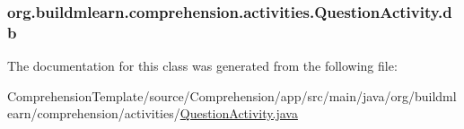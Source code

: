 \subsubsection[{\texorpdfstring{db}{db}}]{ org.\+buildmlearn.\+comprehension.\+activities.\+Question\+Activity.\+db\hspace{0.3cm}{\ttfamily [private]}}\hypertarget{classorg_1_1buildmlearn_1_1comprehension_1_1activities_1_1QuestionActivity_a95d8ebe7963a070ca906f55a01e02574}{}\label{classorg_1_1buildmlearn_1_1comprehension_1_1activities_1_1QuestionActivity_a95d8ebe7963a070ca906f55a01e02574}


The documentation for this class was generated from the following file\+:\begin{DoxyCompactItemize}
\item 
Comprehension\+Template/source/\+Comprehension/app/src/main/java/org/buildmlearn/comprehension/activities/\hyperlink{ComprehensionTemplate_2source_2Comprehension_2app_2src_2main_2java_2org_2buildmlearn_2comprehenscfbf808cb7256d3d0d88c3247345f7d9}{Question\+Activity.\+java}\end{DoxyCompactItemize}
